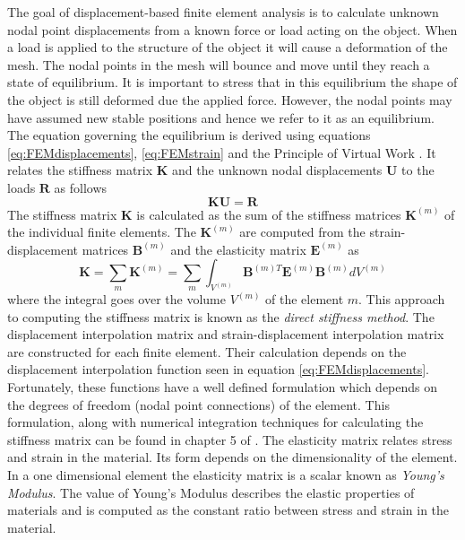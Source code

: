 \documentclass[11pt,a4paper]{report}
\begin{document}
The goal of displacement-based finite element analysis is to calculate
unknown nodal point displacements from a known force or load acting on the
object. When a load is applied to the structure of the object it will cause a
deformation of the mesh. The nodal points in the mesh will bounce and move
until they reach a state of equilibrium. It is important to stress that in this equilibrium the shape of the
object is still deformed due the applied force. However, the nodal points may have
assumed new stable positions and hence we refer to it as an equilibrium. The
equation governing the equilibrium is derived using equations
\ref{eq:FEMdisplacements}, \ref{eq:FEMstrain} and the Principle of Virtual
Work \cite{FEMbook}. It relates the stiffness matrix $\mathbf{K}$ and the unknown nodal
displacements $\mathbf{U}$ to the loads $\mathbf{R}$ as follows
\begin{equation}\label{eq:FEMequilibrium}
\mathbf{K}\mathbf{U} = \mathbf{R}
\end{equation}
The stiffness matrix $\mathbf{K}$ is calculated as the sum of the stiffness
matrices $\mathbf{K}^{(m)}$ of the individual finite elements. The
$\mathbf{K}^{(m)}$ are
computed from the strain-displacement matrices $\mathbf{B}^{(m)}$ and the
elasticity matrix $\mathbf{E}^{(m)}$ as
\begin{equation}\label{eq:FEMstiffness}
\mathbf{K} = \sum_m \mathbf{K}^{(m)} = \sum_m \int_{V^{(m)}} \mathbf{B}^{(m)T}
  \mathbf{E}^{(m)} \mathbf{B}^{(m)} dV^{(m)}
\end{equation}
where the integral goes over the volume $V^{(m)}$ of the element $m$. This
approach to computing the stiffness matrix is known as the \textit{direct
  stiffness method}. The displacement interpolation matrix and strain-displacement
interpolation matrix are constructed for each finite element. Their calculation
depends on the displacement interpolation function seen in equation
\ref{eq:FEMdisplacements}. Fortunately, these functions have a well defined
formulation which depends on the degrees of freedom (nodal point connections) of
the element. This formulation, along with numerical integration techniques for
calculating the stiffness matrix can be found in chapter 5 of \cite{FEMbook}. The elasticity matrix relates stress and
strain in the material. Its form depends on the dimensionality of the
element. In a one dimensional element the elasticity matrix is a scalar known as
\textit{Young's Modulus}. The value of Young's Modulus describes the elastic
properties of materials and is computed as the constant ratio between stress and strain
in the material.
\end{document}
